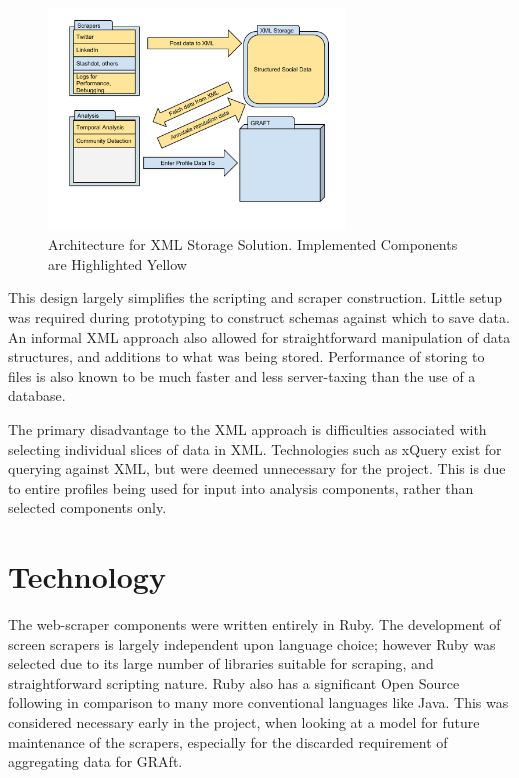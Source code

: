 \begin{figure}[h!]
\centering
\includegraphics[width=0.7\textwidth]{Images/XML_Storage_Architecture.pdf}
\caption{Architecture for XML Storage Solution. Implemented Components are Highlighted Yellow}
\end{figure}
This design largely simplifies the scripting and scraper construction. Little setup was required during prototyping to construct schemas against which to save data. An informal XML approach also allowed for straightforward manipulation of data structures, and additions to what was being stored. Performance of storing to files is also known to be much faster and less server-taxing than the use of a database.

The primary disadvantage to the XML approach is difficulties associated with selecting individual slices of data in XML. Technologies such as xQuery exist for querying against XML, but were deemed unnecessary for the project. This is due to entire profiles being used for input into analysis components, rather than selected components only.

\section{Technology}

The web-scraper components were written entirely in Ruby. The development of screen scrapers is largely independent upon language choice; however Ruby was selected due to its large number of libraries suitable for scraping, and straightforward scripting nature. Ruby also has a significant Open Source following in comparison to many more conventional languages like Java. This was considered necessary early in the project, when looking at a model for future maintenance of the scrapers, especially for the discarded requirement of aggregating data for GRAft. 

